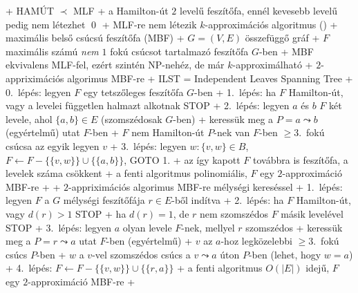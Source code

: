     + \proof HAMÚT $\prec$ MLF
      + a Hamilton-út $2$ levelű feszítőfa, ennél kevesebb levelű
        pedig nem létezhet \qed
    + MLF-re nem létezik $k$-approximációs algoritmus (\noproof)
+ \prob maximális belső csúcsú feszítőfa (MBF)
  + \DataIn $G = (V, E)$ összefüggő gráf
  + \DataOut $F$ maximális számú \emph{nem} $1$ fokú csúcsot
    tartalmazó feszítőfa $G$-ben
  + MBF ekvivalens MLF-fel, ezért szintén NP-nehéz, de már
    $k$-approximálható
  + \alg $2$-appriximációs algorimus MBF-re
    + ILST = Independent Leaves Spanning Tree
    + 0.~lépés: legyen $F$ egy tetszőleges feszítőfa $G$-ben
    + 1.~lépés: ha $F$ Hamilton-út, vagy a levelei független halmazt
      alkotnak \RA STOP
    + 2.~lépés: legyen $a$ és $b$ $F$ két levele, ahol $\{a, b\} \in E$
      (szomszédosak $G$-ben)
      + keressük meg a $P = a \leadsto b$ (egyértelmű) utat $F$-ben
      + $F$ nem Hamilton-út \RA $P$-nek van $F$-ben $\ge 3$.~fokú
        csúcsa \RA az egyik legyen $v$
    + 3.~lépés: legyen $w : \{v, w\} \in B$, $F \gets F - \{\{v, w\}\}
      \cup \{\{a, b\}\}$, GOTO 1.
      + az így kapott $F$ továbbra is feszítőfa, a levelek száma
      csökkent
    + \thm a fenti algoritmus polinomiális, $F$ egy $2$-approximáció
      MBF-re
      + \noproof
  + \alg $2$-appriximációs algorimus MBF-re mélységi kereséssel
    + 1.~lépés: legyen $F$ a $G$ mélységi feszítőfája $r \in E$-ből
      indítva
    + 2.~lépés: ha $F$ Hamilton-út, vagy $d(r) > 1$ \RA STOP
      + ha $d(r) = 1$, de $r$ nem szomszédos $F$ másik levelével \RA
      STOP
    + 3.~lépés: legyen $a$ olyan levele $F$-nek, mellyel $r$
    szomszédos
      + keressük meg a $P = r \leadsto a$ utat $F$-ben (egyértelmű)
      + $v$ az $a$-hoz legközelebbi $\ge 3$.~fokú csúcs $P$-ben
      + $w$ a $v$-vel szomszédos csúcs a $v \leadsto a$ úton $P$-ben
        (lehet, hogy $w = a$)
    + 4.~lépés: $F \gets F - \{\{v, w\}\} \cup \{\{r, a\}\}$
    + \thm a fenti algoritmus $O(\lvert E \rvert)$ idejű, $F$ egy $2$-approximáció
      MBF-re
      + \noproof   


